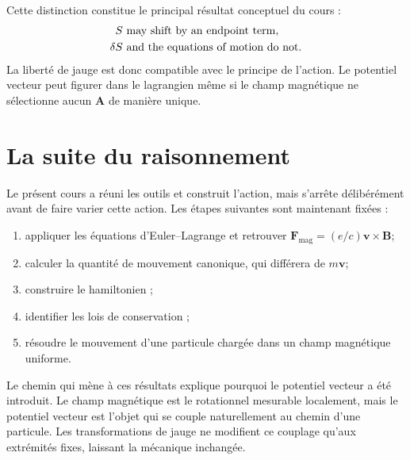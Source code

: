 \begin{classroomqa}
\end{classroomqa}

Cette distinction constitue le principal résultat conceptuel du cours :
\begin{equation}
  \begin{aligned}
    S&\ \hbox{may shift by an endpoint term},\\
    \delta S&\ \hbox{and the equations of motion do not}.
  \end{aligned}
\end{equation}
La liberté de jauge est donc compatible avec le principe de l’action. Le potentiel vecteur peut figurer dans le lagrangien même si le champ magnétique ne sélectionne aucun \(\mathbf A\) de manière unique.

\section{La suite du raisonnement}

Le présent cours a réuni les outils et construit l’action, mais s’arrête délibérément avant de faire varier cette action. Les étapes suivantes sont maintenant fixées :
\begin{enumerate}
  \item appliquer les équations d’Euler--Lagrange et retrouver
  \(\mathbf F_{\mathrm{mag}}=(e/c)\mathbf v\times\mathbf B\);
  \item calculer la quantité de mouvement canonique, qui différera de \(m\mathbf v\);
  \item construire le hamiltonien ;
  \item identifier les lois de conservation ;
  \item résoudre le mouvement d’une particule chargée dans un champ magnétique uniforme.
\end{enumerate}

Le chemin qui mène à ces résultats explique pourquoi le potentiel vecteur a été introduit. Le champ magnétique est le rotationnel mesurable localement, mais le potentiel vecteur est l’objet qui se couple naturellement au chemin d’une particule. Les transformations de jauge ne modifient ce couplage qu’aux extrémités fixes, laissant la mécanique inchangée.